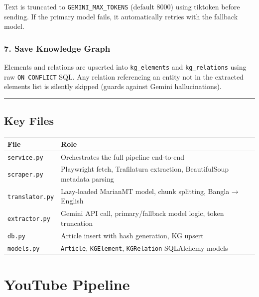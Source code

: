 \documentclass[
]{article}
\newcounter{none} %
\begin{document}
Text is truncated to \texttt{GEMINI\_MAX\_TOKENS} (default 8000) using
tiktoken before sending. If the primary model fails, it automatically
retries with the fallback model.

\subsubsection{7. Save Knowledge Graph}\label{7-save-knowledge-graph}

Elements and relations are upserted into \texttt{kg\_elements} and
\texttt{kg\_relations} using raw \texttt{ON\ CONFLICT} SQL. Any relation
referencing an entity not in the extracted elements list is silently
skipped (guards against Gemini hallucinations).

\begin{center}\rule{0.5\linewidth}{0.5pt}\end{center}

\subsection{Key Files}\label{key-files}

{\def\LTcaptype{none} %
\begin{longtable}[]{@{}ll@{}}
\toprule\noalign{}
File & Role \\
\midrule\noalign{}
\endhead
\bottomrule\noalign{}
\endlastfoot
\texttt{service.py} & Orchestrates the full pipeline end-to-end \\
\texttt{scraper.py} & Playwright fetch, Trafilatura extraction,
BeautifulSoup metadata parsing \\
\texttt{translator.py} & Lazy-loaded MarianMT model, chunk splitting,
Bangla → English \\
\texttt{extractor.py} & Gemini API call, primary/fallback model logic,
token truncation \\
\texttt{db.py} & Article insert with hash generation, KG upsert \\
\texttt{models.py} & \texttt{Article}, \texttt{KGElement},
\texttt{KGRelation} SQLAlchemy models \\
\end{longtable}
}

\label{file-youtube-pipeline}
\section{YouTube Pipeline}\label{youtube-pipeline}
\end{document}
